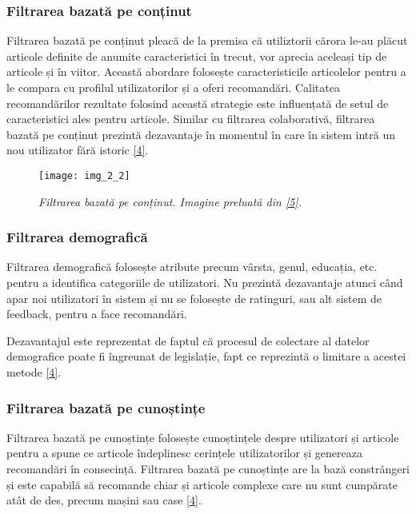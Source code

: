 \subsubsection*{Filtrarea bazată pe conținut}

Filtrarea bazată pe conținut pleacă de la premisa că utiliztorii cărora le-au plăcut articole definite de anumite caracteristici în trecut, vor aprecia aceleași tip de articole și în viitor. Această abordare folosește caracteristicile articolelor pentru a le compara cu profilul utilizatorilor și a oferi recomandări. Calitatea recomandărilor rezultate folosind această strategie este influențată de setul de caracteristici ales pentru articole. Similar cu filtrarea colaborativă, filtrarea bazată pe conținut prezintă dezavantaje în momentul în care în sistem intră un nou utilizator fără istoric \hyperlink{ErionCanoMaurizioMorisio}{[4]}.
\begin{figure}[!h]
	\centering
	\texttt{[image: img\_2\_2]}
	\caption[Filtrarea bazată pe conținut]{\textit{Filtrarea bazată pe conținut. Imagine preluată din \hyperlink{datameetsmedia}{[5]}.}}
\end{figure} 

\subsubsection*{Filtrarea demografică}

Filtrarea demografică folosește atribute precum vârsta, genul, educația, etc. pentru a identifica categoriile de utilizatori. Nu prezintă dezavantaje atunci când apar noi utilizatori în sistem și nu se folosește de ratinguri, sau alt sistem de feedback, pentru a face recomandări.

Dezavantajul este reprezentat de faptul că procesul de colectare al datelor demografice poate fi îngreunat de legislație, fapt ce reprezintă o limitare a acestei metode \hyperlink{ErionCanoMaurizioMorisio}{[4]}.

\subsubsection*{Filtrarea bazată pe cunoștințe}

Filtrarea bazată pe cunoștințe folosește cunoștințele despre utilizatori și articole pentru a spune ce articole îndeplinesc cerințele utilizatorilor și genereaza recomandări în consecință. Filtrarea bazată pe cunoștințe are la bază constrângeri și este capabilă să recomande chiar și articole complexe care nu sunt cumpărate atât de des, precum mașini sau case \hyperlink{ErionCanoMaurizioMorisio}{[4]}.

